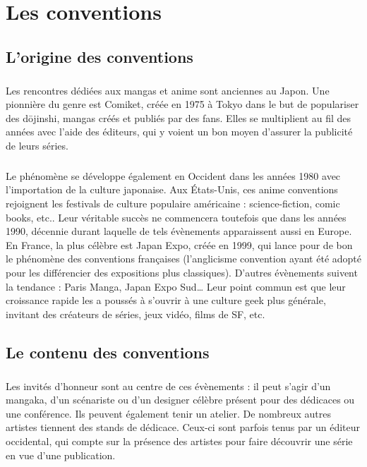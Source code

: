 \chapter{Les conventions}
\section{L'origine des conventions}
\paragraph{}
Les rencontres dédiées aux mangas et anime sont anciennes au Japon. Une pionnière du genre est Comiket, créée en 1975 à Tokyo dans le but de populariser des d\=ojinshi, mangas créés et publiés par des fans. Elles se multiplient au fil des années avec l’aide des éditeurs, qui y voient un bon moyen d’assurer la publicité de leurs séries.
\paragraph{}
Le phénomène se développe également en Occident dans les années 1980 avec l’importation de la culture japonaise. Aux États-Unis, ces anime conventions rejoignent les festivals de culture populaire américaine : science-fiction, comic books, etc.. Leur véritable succès ne commencera toutefois que dans les années 1990, décennie durant laquelle de tels évènements apparaissent aussi en Europe. En France, la plus célèbre est Japan Expo, créée en 1999, qui lance pour de bon le phénomène des conventions françaises (l’anglicisme convention ayant été adopté pour les différencier des expositions plus classiques). D’autres évènements suivent la tendance : Paris Manga, Japan Expo Sud… Leur point commun est que leur croissance rapide les a poussés à s’ouvrir à une culture geek plus générale, invitant des créateurs de séries, jeux vidéo, films de SF, etc.

\section{Le contenu des conventions}
\paragraph{}
Les invités d’honneur sont au centre de ces évènements : il peut s’agir d’un mangaka, d’un scénariste ou d’un designer célèbre présent pour des dédicaces ou une conférence. Ils peuvent également tenir un atelier. De nombreux autres artistes tiennent des stands de dédicace. Ceux-ci sont parfois tenus par un éditeur occidental, qui compte sur la présence des artistes pour faire découvrir une série en vue d’une publication.

